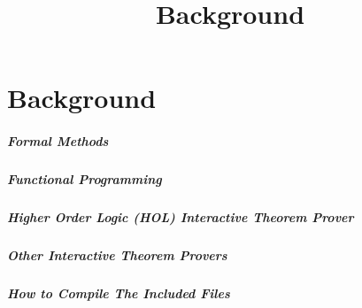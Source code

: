 \documentclass[../../main/main.tex]{subfiles}
\begin{document}
\title{Background}

\chapter{Background}
\paragraph*{Formal Methods}
\paragraph*{Functional Programming}
\paragraph*{Higher Order Logic (HOL) Interactive Theorem Prover}
\paragraph*{Other Interactive Theorem Provers}
\paragraph*{How to Compile The Included Files}
\end{document}
